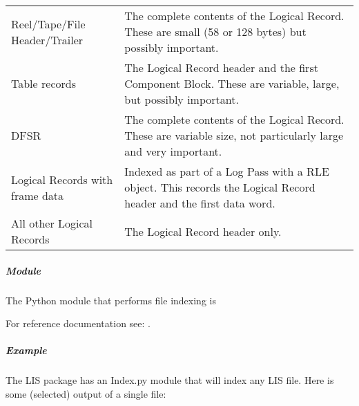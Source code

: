 \documentclass[letterpaper,10pt,english]{sphinxmanual}
\begin{document}
\begin{savenotes}\sphinxattablestart
\centering
\begin{tabulary}{\linewidth}[t]{|T|T|}
\hline
{}\relax &\relax \\
\hline
Reel/Tape/File Header/Trailer
&
The complete contents of the Logical Record.
These are small (58 or 128 bytes) but possibly important.
\\
\hline
Table records
&
The Logical Record header and the first Component Block.
These are variable, large, but possibly important.
\\
\hline
DFSR
&
The complete contents of the Logical Record.
These are variable size, not particularly large and very important.
\\
\hline
Logical Records with frame data
&
Indexed as part of a Log Pass with a RLE object. This records the Logical
Record header and the first data word.
\\
\hline
All other Logical Records
&
The Logical Record header only.
\\
\hline
\end{tabulary}
\par
\sphinxattableend\end{savenotes}


\subparagraph{Module}
\label{\detokenize{tech/LIS_indexing:module}}
The Python module that performs file indexing is 

For reference documentation see: {\hyperref[\detokenize{ref/LIS/core/FileIndexer:totaldepth-lis-core-fileindexer}]{}}.


\subparagraph{Example}
\label{\detokenize{tech/LIS_indexing:example}}
The LIS package has an Index.py module that will index any LIS file. Here is some (selected) output of a single file:
\end{document}

